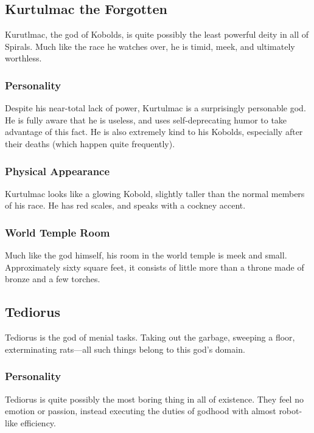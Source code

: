 \subsection*{Kurtulmac the Forgotten}
\begin{goddesc}
\end{goddesc}
Kurutlmac, the god of Kobolds, is quite possibly the least powerful deity in all of Spirals.
Much like the race he watches over, he is timid, meek, and ultimately worthless.

\subsubsection*{Personality}
Despite his near-total lack of power, Kurtulmac is a surprisingly personable god.
He is fully aware that he is useless, and uses self-deprecating humor to take advantage of this fact.
He is also extremely kind to his Kobolds, especially after their deaths (which happen quite frequently).

\subsubsection*{Physical Appearance}
Kurtulmac looks like a glowing Kobold, slightly taller than the normal members of his race.
He has red scales, and speaks with a cockney accent.

\subsubsection*{World Temple Room}
Much like the god himself, his room in the world temple is meek and small.
Approximately sixty square feet, it consists of little more than a throne made of bronze and a few torches.

\subsection*{Tediorus}
\begin{goddesc}
\end{goddesc}
Tediorus is the god of menial tasks.
Taking out the garbage, sweeping a floor, exterminating rats---all such things belong to this god's domain.

\subsubsection*{Personality}
Tediorus is quite possibly the most boring thing in all of existence.
They feel no emotion or passion, instead executing the duties of godhood with almost robot-like efficiency.

